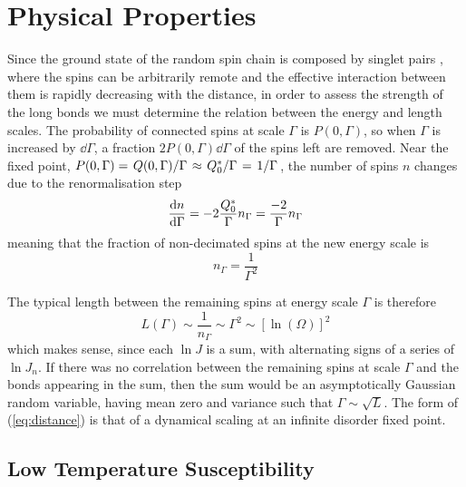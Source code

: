 \documentclass[../sdrg,../../main.tex]{subfiles}
\begin{document}
\section{Physical Properties}


Since the ground state of the random spin chain is composed by singlet pairs , where the spins can be arbitrarily remote and the effective interaction between them is rapidly decreasing with the distance, in order to assess the strength of the long bonds we must determine the relation between the energy and length scales. The probability of connected spins at scale $\Gamma$ is $P(0,\Gamma)$, so when $\Gamma$ is increased by $\dd\Gamma$, a fraction $2P(0,\Gamma)\dd\Gamma$ of the spins left are removed. Near the fixed point, $P(0,\Gamma)=\flatfrac{Q(0,\Gamma)}{\Gamma}\approx \flatfrac{Q_{0}^{*}}{\Gamma}=\flatfrac{1}{\Gamma}$, the number of spins $n$ changes due to the renormalisation step
\begin{equation}
    \dv{n}{\Gamma}=-2\frac{Q_{0}^{*}}{\Gamma}n_{\Gamma}=\frac{-2}{\Gamma}n_{\Gamma}
\end{equation}
meaning that the fraction of non-decimated spins at the new energy scale is
\begin{equation}
    n_{\Gamma}=\frac{1}{\Gamma^{2}}
\end{equation}

The typical length between the remaining spins at energy scale $\Gamma$ is therefore
\begin{equation}
\label{eq:distance}
    L(\Gamma)\sim\frac{1}{n_{\Gamma}}\sim\Gamma^{2}\sim[\ln(\Omega)]^{2}
\end{equation}
which makes sense, since each $\ln{J}$ is a sum, with alternating signs of a series of $\ln{J_n}$. If there was no correlation between the remaining spins at scale $\Gamma$ and the bonds appearing in the sum, then the sum would be an asymptotically Gaussian random variable, having mean zero and variance such that $\Gamma\sim\sqrt{L}$. The form of (\ref{eq:distance}) is that of a dynamical scaling at an infinite disorder fixed point.

\subsection{Low Temperature Susceptibility}
\end{document}
